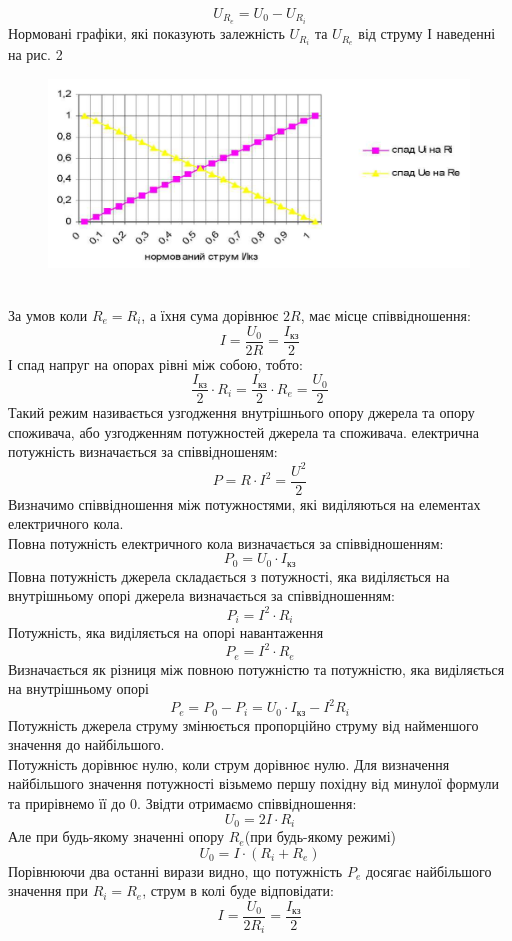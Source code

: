 \documentclass[a4paper,12pt]{article}
\begin{document}
\begin{justify}
	$$U_{R_e}=U_0-U_{R_i}$$
	Нормовані графіки, які показують залежність $U_{R_i}$ та $U_{R_e}$ від струму $І$ наведенні на рис. 2
	\begin{figure}[!h]
		\centering
		\includegraphics[height=50mm]{media/graph2.png}
		\caption{}
		\label{fig:2}
	\end{figure}\\
	За умов коли $R_e=R_i$, а їхня сума дорівнює $2R$, має місце співвідношення:
	$$I=\dfrac{U_0}{2R}=\dfrac{I_{\textrm{кз}}}{2}$$
	І спад напруг на опорах рівні між собою, тобто:
	$$\dfrac{I_{\textrm{кз}}}{2}\cdot R_i=\dfrac{I_{\textrm{кз}}}{2}\cdot R_e=\dfrac{U_0}{2}$$
	Такий режим називається узгодження внутрішнього опору джерела та опору споживача, або узгодженням потужностей джерела та споживача.
	електрична потужність визначається за співвідношеням:
	$$P=R\cdot I^2=\dfrac{U^2}{2}$$ 
	Визначимо співвідношення між потужностями, які виділяються на елементах електричного кола.\\
	Повна потужність електричного кола визначається за співвідношенням:
	$$P_0=U_0\cdot I_{\textrm{кз}}$$\newpage
	Повна потужність джерела складається з потужності, яка виділяється на внутрішньому опорі джерела визначається за співвідношенням:
	$$P_i=I^2\cdot R_i$$
	Потужність, яка виділяється на опорі навантаження
	$$P_e=I^2\cdot R_e$$
	Визначається як різниця між повною потужністю та потужністю, яка виділяється на внутрішньому опорі
	$$P_e=P_0-P_i=U_0\cdot I_{\textrm{кз}}-I^2R_i$$
	Потужність джерела струму змінюється пропорційно струму від найменшого значення до найбільшого.\\
	Потужність дорівнює нулю, коли струм дорівнює нулю. Для визначення найбільшого значення потужності візьмемо першу похідну від минулої формули та прирівнемо її до 0. Звідти отримаємо співвідношення:
	$$U_0=2I\cdot R_i$$
	Але при будь-якому значенні опору $R_e$(при будь-якому режимі)
	$$U_0=I\cdot(R_i+R_e)$$
	Порівнюючи два останні вирази видно, що потужність $P_e$ досягає найбільшого значення при $R_i=R_e$, струм в колі буде відповідати:
	$$I=\dfrac{U_0}{2R_i}=\dfrac{I_{\textrm{кз}}}{2}$$

\end{justify}
\end{document}
